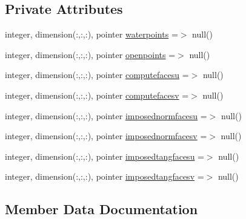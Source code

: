 \subsection*{Private Attributes}
\begin{DoxyCompactItemize}
\item 
integer, dimension(\+:,\+:,\+:), pointer \mbox{\hyperlink{structmodulesequentialassimilation_1_1t__external_a86f74e7e4fc8eaea83f5c78197ba81fa}{waterpoints}} =$>$ null()
\item 
integer, dimension(\+:,\+:,\+:), pointer \mbox{\hyperlink{structmodulesequentialassimilation_1_1t__external_a1fbdb382b3138e5956b95674311c0445}{openpoints}} =$>$ null()
\item 
integer, dimension(\+:,\+:,\+:), pointer \mbox{\hyperlink{structmodulesequentialassimilation_1_1t__external_a6d6132b28ecd318ff12613afd735f18c}{computefacesu}} =$>$ null()
\item 
integer, dimension(\+:,\+:,\+:), pointer \mbox{\hyperlink{structmodulesequentialassimilation_1_1t__external_a4cc194df87bdf39d3b6c65c5dbb44586}{computefacesv}} =$>$ null()
\item 
integer, dimension(\+:,\+:,\+:), pointer \mbox{\hyperlink{structmodulesequentialassimilation_1_1t__external_ab126c191fb1f2a0b2f6d2e0bd643ff70}{imposednormfacesu}} =$>$ null()
\item 
integer, dimension(\+:,\+:,\+:), pointer \mbox{\hyperlink{structmodulesequentialassimilation_1_1t__external_a4832e38b2f072526449ef3e0cb05536b}{imposednormfacesv}} =$>$ null()
\item 
integer, dimension(\+:,\+:,\+:), pointer \mbox{\hyperlink{structmodulesequentialassimilation_1_1t__external_a546e44b812265ea00699ca4eefc60f29}{imposedtangfacesu}} =$>$ null()
\item 
integer, dimension(\+:,\+:,\+:), pointer \mbox{\hyperlink{structmodulesequentialassimilation_1_1t__external_a0809b3f5a4a016fcd68223d6b7153ef5}{imposedtangfacesv}} =$>$ null()
\end{DoxyCompactItemize}


\subsection{Member Data Documentation}
\mbox{\label{structmodulesequentialassimilation_1_1t__external_a6d6132b28ecd318ff12613afd735f18c}} 
